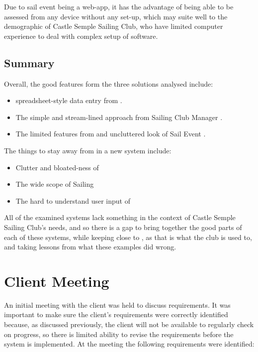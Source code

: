 \documentclass{l4proj}
\begin{document}
Due to sail event being a web-app, it has the advantage of being able to be assessed from any device without any set-up, which may suite well to the demographic of Castle Semple Sailing Club, who have limited computer experience to deal with complex setup of software.

\subsection{Summary}

Overall, the good features form the three solutions analysed include:
\begin{itemize}
    \item
    spreadsheet-style data entry from \citet{sailwave}.
    \item
    The simple and stream-lined approach from Sailing Club Manager \citet{ClubManager}.
    \item
    The limited features from and uncluttered look of Sail Event \citet{SailEvent}.
\end{itemize}

The things to stay away from in a new system include:
\begin{itemize}
    \item
    Clutter and bloated-ness of \citet{sailwave} 
    \item
    The wide scope of Sailing \citet{ClubManager}
    \item
    The hard to understand user input of \citet{SailEvent}
\end{itemize}

All of the examined systems lack something in the context of Castle Semple Sailing Club’s needs, and so there is a gap to bring together the good parts of each of these systems, while keeping close to \citet{sailwave}, as that is what the club is used to, and taking lessons from what these examples did wrong.

\section{Client Meeting}

An initial meeting with the client was held to discuss requirements. It was important to make sure the client’s requirements were correctly identified because, as discussed previously, the client will not be available to regularly check on progress, so there is limited ability to revise the requirements before the system is implemented.  At the meeting the following requirements were identified:
\end{document}
